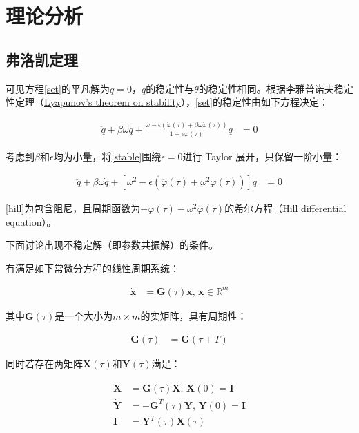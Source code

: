 \section{理论分析}

\subsection{弗洛凯定理}

可见方程\eqref{set}的平凡解为$q=0$，$q$的稳定性与$\theta$的稳定性相同。根据李雅普诺夫稳定性定理（\href{https://en.wikipedia.org/wiki/Lyapunov_stability}{Lyapunov's theorem on stability}）\cite{belyakov_nonlinear_2009}，\eqref{set}的稳定性由如下方程决定：

\begin{align}
    \ddot{q}+\beta\omega\dot{q}+\frac{\omega-\epsilon(\ddot{\varphi}(\tau)+\beta\omega\dot{\varphi}(\tau))}{1+\epsilon\varphi(\tau)}q &= 0 \label{stable}
\end{align}

考虑到$\beta$和$\epsilon$均为小量，将\eqref{stable}围绕$\epsilon=0$进行 Taylor 展开，只保留一阶小量：

\begin{align}
    \ddot{q}+\beta\omega\dot{q}+\left[\omega^{2}-\epsilon\left(\ddot{\varphi}(\tau)+\omega^{2}\varphi(\tau)\right)\right]q &=0 \label{hill}
\end{align}

\eqref{hill}为包含阻尼，且周期函数为$-\ddot{\varphi}(\tau)-\omega^{2}\varphi(\tau)$的希尔方程（\href{https://en.wikipedia.org/wiki/Hill_differential_equation}{Hill differential equation}）。

下面讨论\label{hill}出现不稳定解（即参数共振解）的条件。

有满足如下常微分方程的线性周期系统：

\begin{align}
    \dot{\mathbf{x}} &= \mathbf{G}(\tau)\mathbf{x},\,\mathbf{x}\in\mathbb{R}^{m} \label{sys}
\end{align}

其中$\mathbf{G}(\tau)$是一个大小为$m\times m$的实矩阵，具有周期性：

\begin{align}
    \mathbf{G}(\tau) &= \mathbf{G}(\tau+T)
\end{align}

同时若存在两矩阵$\mathbf{X}(\tau)$和$\mathbf{Y}(\tau)$满足：

\begin{align}
    \dot{\mathbf{X}} &= \mathbf{G}(\tau)\mathbf{X},\,\mathbf{X}(0)=\mathbf{I} \label{x} \\ 
    \dot{\mathbf{Y}} &= -\mathbf{G}^{T}(\tau)\mathbf{Y},\,\mathbf{Y}(0)=\mathbf{I} \label{y} \\
    \mathbf{I} &= \mathbf{Y}^{T}(\tau)\mathbf{X}(\tau) \label{xy}
\end{align}

